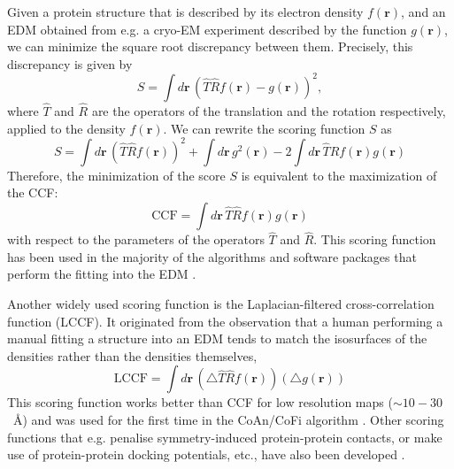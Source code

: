 Given a protein structure that is described by its electron density $f(\mathbf{r})$,
and an EDM obtained from e.g. a cryo-EM experiment described by the function
$g(\mathbf{r})$, we can minimize the square root discrepancy between
them. Precisely, this discrepancy is given by
\begin{equation}
S=\int d\mathbf{r}\,\left(\hat T \hat R f(\mathbf{r})-g(\mathbf{r})\right)^{2},
\end{equation}
where $\hat T$ and $\hat R$ are the operators of the translation and the rotation
respectively, applied to the density $f(\mathbf{r})$. We can rewrite
the scoring function $S$ as 
\begin{equation}
S=\int d\mathbf{r}\,\left(\hat T \hat R f (\mathbf{r})\right)^{2}+\int d\mathbf{r}\, g^{2}(\mathbf{r})-2\int d\mathbf{r}\, \hat T \hat R f(\mathbf{r})g(\mathbf{r})
\end{equation}
Therefore, the minimization of the score $S$ is equivalent to the maximization
of the CCF: 
\begin{equation}
\textrm {CCF}=\int d\mathbf{r}\, \hat T \hat R f(\mathbf{r})g(\mathbf{r})
\end{equation}
with respect to the parameters of the operators $\hat T$ and $\hat R$. This
scoring function has been used in the majority of the algorithms and software
packages that perform the fitting into the EDM \cite{Wriggers2010,Siebert2009,Suhre2006}.

Another widely used scoring function is the Laplacian-filtered cross-correlation
function (LCCF). It originated from the observation that a human
performing a manual fitting a structure into an EDM tends to match
the isosurfaces of the densities rather than the densities themselves,
\begin{equation}
\textrm {LCCF}=\int d\mathbf{r}\,\left(\triangle \hat T \hat R f(\mathbf{r})\right)\left(\triangle g(\mathbf{r})\right)
\end{equation}
This scoring function works better than CCF for low resolution maps ($\sim 10-30$~\AA) \cite{Wriggers2010} and was used for the first time in the CoAn/CoFi
algorithm \cite{Volkmann1999}. Other scoring functions
that e.g. penalise symmetry-induced protein-protein contacts, or make use of protein-protein docking potentials, etc., have also been developed \cite{Vasishtan2011}.
